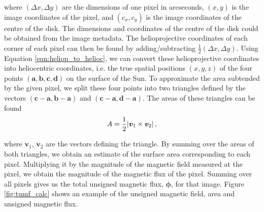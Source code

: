\documentclass[11pt,a4paper,onecolumn]{report}
\DeclarePairedDelimiter{\abs}{\lvert}{\rvert}
\begin{document}
where  \((\Delta x, \Delta y)\) are the dimensions of one pixel in arcseconds,
\( (x, y) \) is the image coordinates of the pixel, and \( (c_x, c_y) \) is the
image coordinates of the centre of the disk. The dimensions and coordinates of
the centre of the disk could be obtained from the image metadata. The
helioprojective coordinates of each corner of each pixel can then be found by
adding/subtracting \(\frac{1}{2} (\Delta x, \Delta y)\). Using Equation
\ref{eqn:heliop_to_helioc}, we can convert these helioprojective coordinates
into heliocentric coordinates, i.e. the true spatial positions \((x, y, z)\) of
the four points \((\bm{a}, \bm{b}, \bm{c}, \bm{d})\) on the surface of the Sun.
To approximate the area subtended by the given pixel, we split these four points
into two triangles defined by the vectors \((\bm{c}-\bm{a}, \bm{b} - \bm{a}) \)
and \((\bm{c}-\bm{a}, \bm{d} - \bm{a}) \). The areas of these triangles can be
found 
\begin{align}
  A = \frac{1}{2} \abs*{\bm{v}_1 \times \bm{v}_2} \, ,
\end{align}


where \(\bm{v}_1\), \(\bm{v}_2\) are the vectors defining the triangle. By
summing over the areas of both triangles, we obtain an estimate of the surface
area corresponding to each pixel. Multiplying it by the magnitude of the
magnetic field measured at the pixel, we obtain the magnitude of the magnetic
flux of the pixel. Summing over all pixels gives us the total unsigned magnetic
flux, \(\bm{\phi}\), for that image. Figure \ref{fig:tumf_calc} shows an example
of the unsigned magnetic field, area and unsigned magnetic flux.
\end{document}
